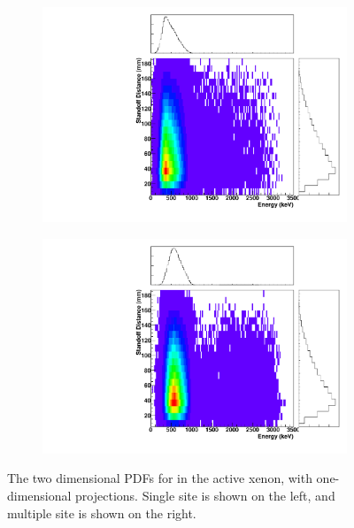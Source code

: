 \documentclass[herrin-thesis.tex]{subfiles}
\begin{document}
\begin{figure}[hp]
\centering
	\begin{subfigure}[b]{0.35\textwidth}
	\centering
	\includegraphics[width=\textwidth]{./plots/PDFs/analysis_pdf_ActiveLXe_Rn222_ss.pdf}
\end{subfigure}\hspace{0.1\textwidth}%
\begin{subfigure}[b]{0.35\textwidth}
	\centering
	\includegraphics[width=1\textwidth]{./plots/PDFs/analysis_pdf_ActiveLXe_Rn222_ms.pdf}
	\end{subfigure}
\caption[PDF for  in the active xenon]{The two dimensional PDFs for  in the active xenon, with one-dimensional projections. Single site is shown on the left, and multiple site is shown on the right.}
\label{fig:analysis_pdf_ActiveLXe_Rn222}
\end{figure}
\end{document}
